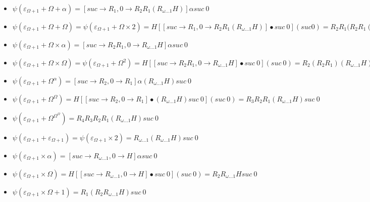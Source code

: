 \documentclass[10pt]{article}
\begin{document}
\begin{itemize}
\item \( \psi(\varepsilon_{\Omega+1}+\Omega+\alpha) = [suc \rightarrow R_1, 0 \rightarrow R_2 R_1 (R_{\omega \ldots 1} H)] \alpha suc\ 0 \)

\item \( \psi(\varepsilon_{\Omega+1}+\Omega+\Omega) = \psi(\varepsilon_{\Omega+1}+\Omega \times 2) = H [[suc \rightarrow R_1, 0 \rightarrow R_2 R_1 (R_{\omega \ldots 1} H)] \bullet suc\ 0] (suc 0) = R_2 R_1 (R_2 R_1 (R_{\omega \ldots 1} H) suc\ 0 \)

\item \( \psi(\varepsilon_{\Omega+1}+\Omega \times \alpha) = [suc \rightarrow R_2 R_1, 0 \rightarrow R_{\omega \ldots 1} H] \alpha suc\ 0 \) 

\item \( \psi(\varepsilon_{\Omega+1}+\Omega \times \Omega) = \psi(\varepsilon_{\Omega+1}+\Omega^2) = H [[suc \rightarrow R_2 R_1, 0 \rightarrow R_{\omega \ldots 1} H] \bullet suc\ 0] (suc\ 0) = R_2 (R_2 R_1) (R_{\omega \ldots 1} H) suc\ 0 \) 

\item \( \psi(\varepsilon_{\Omega+1}+\Omega^\alpha) = [suc \rightarrow R_2, 0 \rightarrow R_1] \alpha (R_{\omega \ldots 1} H) suc\ 0 \)

\item \( \psi(\varepsilon_{\Omega+1}+\Omega^\Omega) = H [[suc \rightarrow R_2, 0 \rightarrow R_1] \bullet (R_{\omega \ldots 1} H) suc\ 0] (suc\ 0) = R_3 R_2 R_1 (R_{\omega \ldots 1} H) suc\ 0 \)

\item \( \psi(\varepsilon_{\Omega+1}+\Omega^{\Omega^\Omega}) = R_4 R_3 R_2 R_1 (R_{\omega \ldots 1} H) suc\ 0 \)

\item \( \psi(\varepsilon_{\Omega+1}+\varepsilon_{\Omega+1}) = \psi(\varepsilon_{\Omega+1} \times 2) = R_{\omega \ldots 1} (R_{\omega \ldots 1} H) suc\ 0 \)

\item \( \psi(\varepsilon_{\Omega+1} \times \alpha) = [suc \rightarrow R_{\omega \ldots 1}, 0 \rightarrow H] \alpha suc\ 0 \)

\item \( \psi(\varepsilon_{\Omega+1} \times \Omega) = H [[suc \rightarrow R_{\omega \ldots 1}, 0 \rightarrow H] \bullet suc\ 0] (suc\ 0) = R_2 R_{\omega \ldots 1} H suc\ 0 \)


\item \( \psi(\varepsilon_{\Omega+1} \times \Omega+1) = R_1 (R_2 R_{\omega \ldots 1} H) suc\ 0 \)


\end{itemize}
\end{document}
